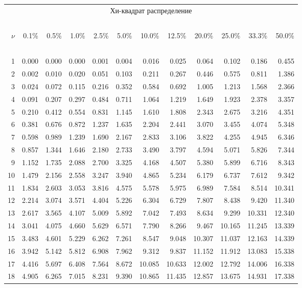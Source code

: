 \documentclass[pdftex,11pt,openany]{book}\usepackage[]{graphicx}\usepackage[]{color}
\begin{document}
{\begin{center}
\begin{tabular}{rr@{\ }r@{\ }r@{\ }r@{\ }r@{\ }r@{\ }r@{\ }r@{\ }r@{\ }r@{\ }r}
\end{tabular}
\end{center}


\newpage

\begin{center}
\begin{tabular}
      {r@{\ }r@{\ }r@{\ }r@{\ }r@{\ }r@{\ }r@{\ }r@{\ }r@{\ }r@{\ }r@{\ }r}
\multicolumn{12}{c}{Хи-квадрат распределение}\\
\ \\
$\nu$&0.1\%&0.5\%&1.0\%&2.5\%&5.0\%&10.0\%&12.5\%&20.0\%&25.0\%&33.3\%&50.0\%\\
\ \\
 1&0.000&0.000&0.000&0.001&0.004&0.016&0.025&0.064&0.102&0.186&0.455\\
 2&0.002&0.010&0.020&0.051&0.103&0.211&0.267&0.446&0.575&0.811&1.386\\
 3&0.024&0.072&0.115&0.216&0.352&0.584&0.692&1.005&1.213&1.568&2.366\\
 4&0.091&0.207&0.297&0.484&0.711&1.064&1.219&1.649&1.923&2.378&3.357\\
 5&0.210&0.412&0.554&0.831&1.145&1.610&1.808&2.343&2.675&3.216&4.351\\
 6&0.381&0.676&0.872&1.237&1.635&2.204&2.441&3.070&3.455&4.074&5.348\\
 7&0.598&0.989&1.239&1.690&2.167&2.833&3.106&3.822&4.255&4.945&6.346\\
 8&0.857&1.344&1.646&2.180&2.733&3.490&3.797&4.594&5.071&5.826&7.344\\
 9&1.152&1.735&2.088&2.700&3.325&4.168&4.507&5.380&5.899&6.716&8.343\\
10&1.479&2.156&2.558&3.247&3.940&4.865&5.234&6.179&6.737&7.612&9.342\\
11&1.834&2.603&3.053&3.816&4.575&5.578&5.975&6.989&7.584&8.514&10.341\\
12&2.214&3.074&3.571&4.404&5.226&6.304&6.729&7.807&8.438&9.420&11.340\\
13&2.617&3.565&4.107&5.009&5.892&7.042&7.493&8.634&9.299&10.331&12.340\\
14&3.041&4.075&4.660&5.629&6.571&7.790&8.266&9.467&10.165&11.245&13.339\\
15&3.483&4.601&5.229&6.262&7.261&8.547&9.048&10.307&11.037&12.163&14.339\\
16&3.942&5.142&5.812&6.908&7.962&9.312&9.837&11.152&11.912&13.083&15.338\\
17&4.416&5.697&6.408&7.564&8.672&10.085&10.633&12.002&12.792&14.006&16.338\\
18&4.905&6.265&7.015&8.231&9.390&10.865&11.435&12.857&13.675&14.931&17.338\\

\end{tabular}
\end{center}}
\end{document}
